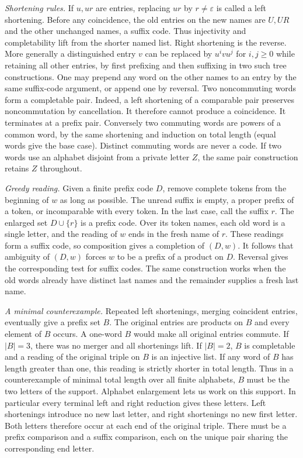 \documentclass[11pt,a4paper]{article}
\newcommand{\eps}{\varepsilon}
\newcommand{\parhead}[1]{\par\smallskip\noindent\textit{#1.}\enspace}
\begin{document}
\parhead{Shortening rules}
If $u,ur$ are entries, replacing $ur$ by $r\ne\eps$ is called a left shortening. Before any coincidence, the old entries on the new names are $U,UR$ and the other unchanged names, a suffix code. Thus injectivity and completability lift from the shorter named list. Right shortening is the reverse. More generally a distinguished entry $v$ can be replaced by $u^iv u^j$ for $i,j\ge0$ while retaining all other entries, by first prefixing and then suffixing in two such tree constructions. One may prepend any word on the other names to an entry by the same suffix-code argument, or append one by reversal.
Two noncommuting words form a completable pair. Indeed, a left shortening of a comparable pair preserves noncommutation by cancellation. It therefore cannot produce a coincidence. It terminates at a prefix pair. Conversely two commuting words are powers of a common word, by the same shortening and induction on total length (equal words give the base case). Distinct commuting words are never a code. If two words use an alphabet disjoint from a private letter $Z$, the same pair construction retains $Z$ throughout.
\parhead{Greedy reading}
Given a finite prefix code $D$, remove complete tokens from the beginning of $w$ as long as possible. The unread suffix is empty, a proper prefix of a token, or incomparable with every token. In the last case, call the suffix $r$. The enlarged set $D\cup\{r\}$ is a prefix code. Over its token names, each old word is a single letter, and the reading of $w$ ends in the fresh name of $r$. These readings form a suffix code, so composition gives a completion of $(D,w)$. It follows that ambiguity of $(D,w)$ forces $w$ to be a prefix of a product on $D$. Reversal gives the corresponding test for suffix codes. The same construction works when the old words already have distinct last names and the remainder supplies a fresh last name.

\parhead{A minimal counterexample}
Repeated left shortenings, merging coincident entries, eventually give a prefix set $B$. The original entries are products on $B$ and every element of $B$ occurs. A one-word $B$ would make all original entries commute. If $|B|=3$, there was no merger and all shortenings lift. If $|B|=2$, $B$ is completable and a reading of the original triple on $B$ is an injective list. If any word of $B$ has length greater than one, this reading is strictly shorter in total length. Thus in a counterexample of minimal total length over all finite alphabets, $B$ must be the two letters of the support. Alphabet enlargement lets us work on this support. In particular every terminal left and right reduction gives these letters. Left shortenings introduce no new last letter, and right shortenings no new first letter. Both letters therefore occur at each end of the original triple. There must be a prefix comparison and a suffix comparison, each on the unique pair sharing the corresponding end letter.
\end{document}
